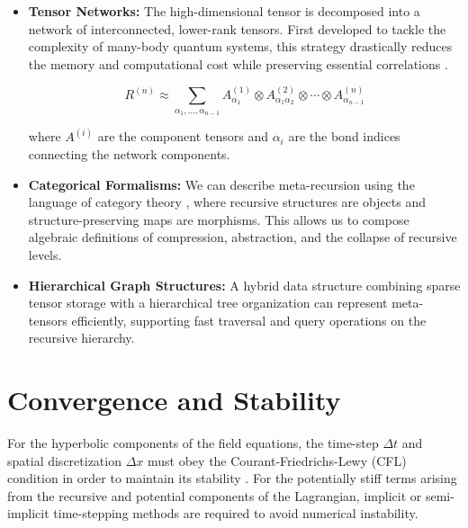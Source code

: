 \begin{itemize}

    \item \textbf{Tensor Networks:} The high-dimensional tensor is decomposed into a network of interconnected, lower-rank tensors. First developed to tackle the complexity of many-body quantum systems, this strategy drastically reduces the memory and computational cost while preserving essential correlations \autocite{Orus2014}.
    
    \begin{equation}
    R^{(n)} \approx \sum_{\alpha_1, \ldots, \alpha_{n-1}} A^{(1)}_{\alpha_1} \otimes A^{(2)}_{\alpha_1 \alpha_2} \otimes \cdots \otimes A^{(n)}_{\alpha_{n-1}}
    \end{equation}
    
    where \(A^{(i)}\) are the component tensors and \(\alpha_i\) are the bond indices connecting the network components.

    \item \textbf{Categorical Formalisms:} We can describe meta-recursion using the language of category theory \autocite{MacLane1998}, where recursive structures are objects and structure-preserving maps are morphisms. This allows us to compose algebraic definitions of compression, abstraction, and the collapse of recursive levels.
    
    \item \textbf{Hierarchical Graph Structures:} A hybrid data structure combining sparse tensor storage with a hierarchical tree organization can represent meta-tensors efficiently, supporting fast traversal and query operations on the recursive hierarchy.

\end{itemize}


\section{Convergence and Stability}
\label{17.5:convergence_and_stability}

For the hyperbolic components of the field equations, the time-step \(\Delta t\) and spatial discretization \(\Delta x\) must obey the Courant-Friedrichs-Lewy (CFL) condition in order to maintain its stability \autocite{CourantFriedrichsLewy1928}. For the potentially stiff terms arising from the recursive and potential components of the Lagrangian, implicit or semi-implicit time-stepping methods are required to avoid numerical instability.


